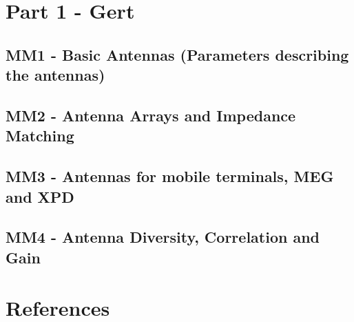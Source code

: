 



    \singlespacing
    \pagestyle{empty}	
	
	\cleardoublepage
	
	\pagestyle{plain}
		
	\tableofcontents 
	\onehalfspacing
	\pagestyle{fancy} %
    \setcounter{page}{0} %

\part{Part 1 - Gert}

\chapter{MM1 - Basic Antennas (Parameters describing the antennas)}





\chapter{MM2 - Antenna Arrays and Impedance Matching}



\chapter{MM3 - Antennas for mobile terminals, MEG and XPD}






\chapter{MM4 - Antenna Diversity, Correlation and Gain}






\part{References}






